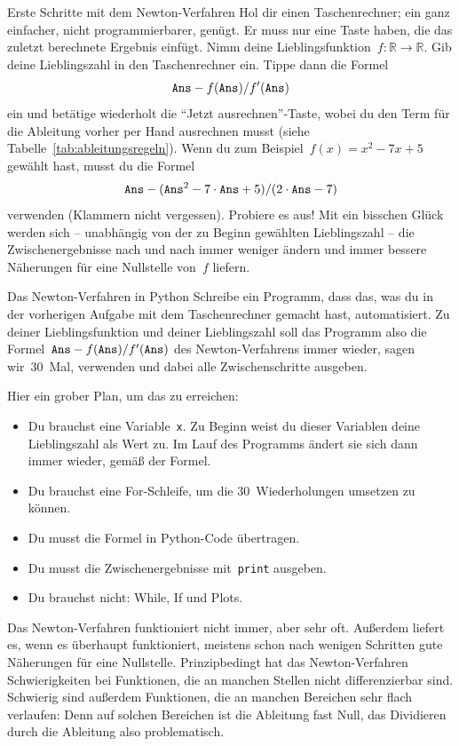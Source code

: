 \documentclass{blatt}
\newcommand{\RR}{\mathbb{R}}
\begin{document}
\begin{aufgabe}{Erste Schritte mit dem Newton-Verfahren}
Hol dir einen Taschenrechner; ein ganz einfacher, nicht programmierbarer,
genügt. Er muss nur eine Taste \Ans haben, die das zuletzt berechnete
Ergebnis einfügt. Nimm deine Lieblingsfunktion~$f : \RR \to \RR$. Gib deine
Lieblingszahl in den Taschenrechner ein. Tippe dann die Formel
\[ \texttt{Ans} - f(\texttt{Ans})/f'(\texttt{Ans}) \]
ein und betätige wiederholt die "`Jetzt ausrechnen"'-Taste, wobei du den Term
für die Ableitung vorher per Hand ausrechnen musst (siehe
Tabelle~\ref{tab:ableitungsregeln}). Wenn du zum Beispiel~$f(x) = x^2 - 7x + 5$
gewählt hast, musst du die Formel
\[ \texttt{Ans} - (\texttt{Ans}^2 - 7 \cdot \texttt{Ans} + 5) / (2 \cdot \texttt{Ans} - 7) \]
verwenden (Klammern nicht vergessen). Probiere es aus! Mit ein bisschen Glück
werden sich -- unabhängig von der zu Beginn gewählten Lieblingszahl -- die
Zwischenergebnisse nach und nach immer weniger ändern und immer bessere
Näherungen für eine Nullstelle von~$f$ liefern.
\end{aufgabe}

\begin{aufgabe}{Das Newton-Verfahren in Python}
Schreibe ein Programm, dass das, was du in der vorherigen Aufgabe mit dem
Taschenrechner gemacht hast, automatisiert. Zu deiner Lieblingsfunktion und
deiner Lieblingszahl soll das Programm also die Formel~$\texttt{Ans} -
f(\texttt{Ans})/f'(\texttt{Ans})$ des Newton-Verfahrens immer wieder, sagen wir~30~Mal,
verwenden und dabei alle Zwischenschritte ausgeben.

Hier ein grober Plan, um das zu erreichen:
\begin{itemize}
\item Du brauchst eine Variable~\texttt{x}. Zu Beginn weist du
dieser Variablen deine Lieblingszahl als Wert zu. Im Lauf des Programms ändert
sie sich dann immer wieder, gemäß der Formel.
\item Du brauchst eine For-Schleife, um die 30~Wiederholungen umsetzen zu
können.
\item Du musst die Formel in Python-Code übertragen.
\item Du musst die Zwischenergebnisse mit~\texttt{print} ausgeben.
\item Du brauchst nicht: While, If und Plots.
\end{itemize}
\vspace{-1em}
\end{aufgabe}

Das Newton-Verfahren funktioniert nicht immer, aber sehr oft. Außerdem liefert
es, wenn es überhaupt funktioniert, meistens schon nach wenigen Schritten gute
Näherungen für eine Nullstelle. Prinzipbedingt hat das Newton-Verfahren
Schwierigkeiten bei Funktionen, die an manchen Stellen nicht differenzierbar
sind. Schwierig sind außerdem Funktionen, die an manchen Bereichen sehr
flach verlaufen: Denn auf solchen Bereichen ist die Ableitung fast Null, das
Dividieren durch die Ableitung also problematisch.
\end{document}
